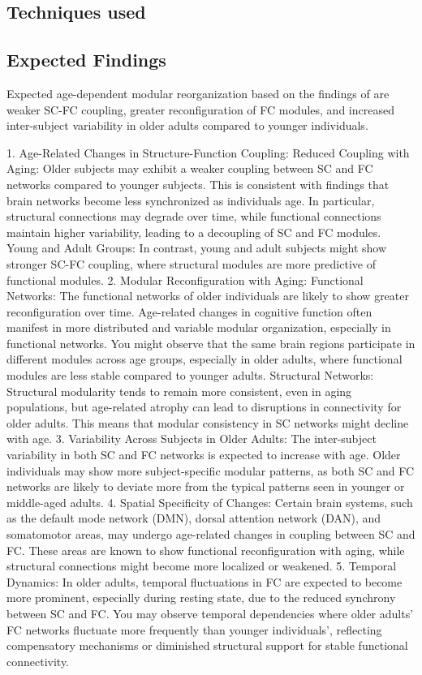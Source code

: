 \subsection{Techniques used}



\subsection{Expected Findings}

Expected age-dependent modular reorganization based on
the findings of \cite{Puxeddu2022} are weaker SC-FC coupling, 
greater reconfiguration of FC modules, 
and increased inter-subject variability in older adults 
compared to younger individuals.

1. Age-Related Changes in Structure-Function Coupling:
Reduced Coupling with Aging: Older subjects may exhibit a weaker coupling between 
SC and FC networks compared to younger subjects. This is consistent with findings that 
brain networks become less synchronized as individuals age. In particular, structural 
connections may degrade over time, while functional connections maintain higher variability, 
leading to a decoupling of SC and FC modules.
Young and Adult Groups: In contrast, young and adult subjects might show stronger SC-FC coupling, 
where structural modules are more predictive of functional modules.
2. Modular Reconfiguration with Aging:
Functional Networks: The functional networks of older individuals are likely to show greater 
reconfiguration over time. Age-related changes in cognitive function often manifest in more 
distributed and variable modular organization, especially in functional networks. You might 
observe that the same brain regions participate in different modules across age groups, 
especially in older adults, where functional modules are less stable compared to younger adults.
Structural Networks: Structural modularity tends to remain more consistent, even in aging 
populations, but age-related atrophy can lead to disruptions in connectivity for older adults. 
This means that modular consistency in SC networks might decline with age.
3. Variability Across Subjects in Older Adults:
The inter-subject variability in both SC and FC networks is expected to increase with age. 
Older individuals may show more subject-specific modular patterns, as both SC and FC networks 
are likely to deviate more from the typical patterns seen in younger or middle-aged adults.
4. Spatial Specificity of Changes:
Certain brain systems, such as the default mode network (DMN), dorsal attention network (DAN), 
and somatomotor areas, may undergo age-related changes in coupling between SC and FC. 
These areas are known to show functional reconfiguration with aging, while structural connections 
might become more localized or weakened.
5. Temporal Dynamics:
In older adults, temporal fluctuations in FC are expected to become more prominent, especially 
during resting state, due to the reduced synchrony between SC and FC. You may observe temporal 
dependencies where older adults' FC networks fluctuate more frequently than younger individuals', 
reflecting compensatory mechanisms or diminished structural support for stable functional 
connectivity.

